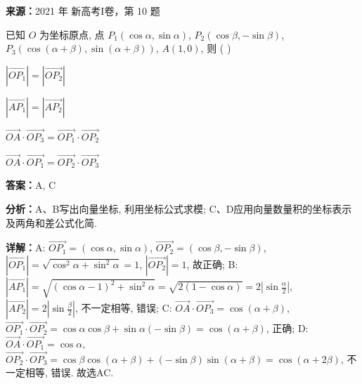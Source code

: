 \begin{question}[points=5]
\textbf{来源：}2021 年 新高考I卷，第 10 题\par
已知 $O$ 为坐标原点, 点 $P_1(\cos\alpha, \sin\alpha)$, $P_2(\cos\beta, -\sin\beta)$, $P_3(\cos(\alpha+\beta), \sin(\alpha+\beta))$, $A(1,0)$, 则 ( )
\begin{choices}
  \item $|\overrightarrow{OP_1}| = |\overrightarrow{OP_2}|$
  \item $|\overrightarrow{AP_1}| = |\overrightarrow{AP_2}|$
  \item $\overrightarrow{OA} \cdot \overrightarrow{OP_3} = \overrightarrow{OP_1} \cdot \overrightarrow{OP_2}$
  \item $\overrightarrow{OA} \cdot \overrightarrow{OP_1} = \overrightarrow{OP_2} \cdot \overrightarrow{OP_3}$
\end{choices}
\begin{solution}
\textbf{答案：}A, C

\textbf{分析：}A、B写出向量坐标, 利用坐标公式求模; C、D应用向量数量积的坐标表示及两角和差公式化简.

\textbf{详解：}A: $\overrightarrow{OP_1} = (\cos\alpha, \sin\alpha)$, $\overrightarrow{OP_2} = (\cos\beta, -\sin\beta)$, $|\overrightarrow{OP_1}| = \sqrt{\cos^2\alpha + \sin^2\alpha} = 1$, $|\overrightarrow{OP_2}| = 1$, 故正确; B: $|\overrightarrow{AP_1}| = \sqrt{(\cos\alpha-1)^2 + \sin^2\alpha} = \sqrt{2(1-\cos\alpha)} = 2|\sin\frac{\alpha}{2}|$, $|\overrightarrow{AP_2}| = 2|\sin\frac{\beta}{2}|$, 不一定相等, 错误; C: $\overrightarrow{OA} \cdot \overrightarrow{OP_3} = \cos(\alpha+\beta)$, $\overrightarrow{OP_1} \cdot \overrightarrow{OP_2} = \cos\alpha\cos\beta + \sin\alpha(-\sin\beta) = \cos(\alpha+\beta)$, 正确; D: $\overrightarrow{OA} \cdot \overrightarrow{OP_1} = \cos\alpha$, $\overrightarrow{OP_2} \cdot \overrightarrow{OP_3} = \cos\beta\cos(\alpha+\beta) + (-\sin\beta)\sin(\alpha+\beta) = \cos(\alpha+2\beta)$, 不一定相等, 错误. 故选AC.
\end{solution}
\end{question}

